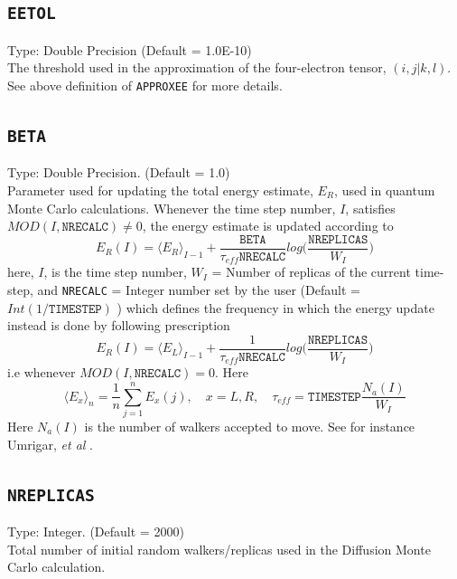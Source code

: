 \documentclass[a4paper,twoside,openany]{book}
\begin{document}
{{\subsection{\texttt{EETOL}}
Type: Double Precision (Default = 1.0E-10)\\
The threshold used in the approximation of the four-electron tensor, $(i,j|k,l)$. See above definition of \texttt{APPROXEE} for more details.

\subsection{\texttt{BETA}}
Type: Double Precision. (Default = 1.0)\\
Parameter used for updating the total energy estimate, $E_{R}$, used in quantum Monte Carlo calculations. Whenever the time step number, $I$, satisfies $MOD(I, \texttt{NRECALC}) \neq 0$, 
the energy estimate is updated according to
\begin{equation}
E_{R}(I) = \langle E_{R} \rangle_{I-1} +\frac{\texttt{BETA}}{\tau_{eff} \texttt{NRECALC}} log \Big(\frac{\texttt{NREPLICAS}}{W_{I} } \Big)
\end{equation}
here, $I$, is the time step number, $W_{I}$ = Number of replicas of the current  time-step, and \texttt{NRECALC} = Integer number set by the user (Default = $Int(1/ \texttt{TIMESTEP})$ ) which defines the frequency
 in  which the energy update instead is done by  following prescription
 \begin{equation}
E_{R}(I) = \langle E_{L} \rangle_{I-1} + \frac{1}{\tau_{eff} \texttt{NRECALC}} log \Big(\frac{\texttt{NREPLICAS}}{W_{I} } \Big)
\end{equation}
i.e whenever  $MOD(I, \texttt{NRECALC}) = 0$. Here
\begin{equation}
\langle E_{x} \rangle_{n} = \frac{1}{n}\sum_{ j=1}^{n} E_{x}(j), \quad x=L,R, \quad \tau_{eff} = \texttt{TIMESTEP}\frac{N_{a}(I)}{W_{I}}
\end{equation}
Here $N_{a}(I)$ is the number of walkers accepted to move. See for instance Umrigar, {\it et al} \cite{UMRIGAR}.

\subsection{\texttt{NREPLICAS}}
Type: Integer. (Default = 2000)\\
Total number of initial random walkers/replicas used in the Diffusion Monte Carlo calculation.

}}
\end{document}
